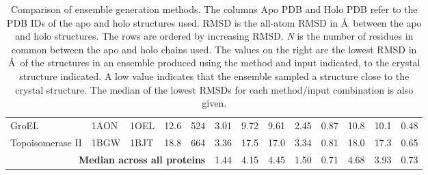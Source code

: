 \begin{table}
\begin{footnotesize}
\begin{tabular}{ l l l l l l l l l l l l l }
GroEL                     & 1AON & 1OEL & 12.6 & 524 & 3.01 & 9.72 & 9.61 & 2.45 & 0.87 & 10.8 & 10.1 & 0.48 \\
Topoisomerase II          & 1BGW & 1BJT & 18.8 & 664 & 3.36 & 17.5 & 17.0 & 3.34 & 0.81 & 18.0 & 17.3 & 0.65 \\
\hline
\multicolumn{5}{r}{\textbf{Median across all proteins}} & 1.44  & 4.15  & 4.45  & 1.50  & 0.71  & 4.68  & 3.93  & 0.73 \\
\hline
\end{tabular}
\end{footnotesize}

\caption[Ability of ensemble generation methods to sample conformational space]
{Comparison of ensemble generation methods.
The columns Apo PDB and Holo PDB refer to the PDB IDs of the apo and holo structures used.
RMSD is the all-atom RMSD in \AA\ between the apo and holo structures.
The rows are ordered by increasing RMSD.
\textit{N} is the number of residues in common between the apo and holo chains used.
The values on the right are the lowest RMSD in \AA\ of the structures in an ensemble produced using the method and input indicated, to the crystal structure indicated.
A low value indicates that the ensemble sampled a structure close to the crystal structure.
The median of the lowest RMSDs for each method/input combination is also given.}

\label{tab:ensemble_dataset}
\end{table}



